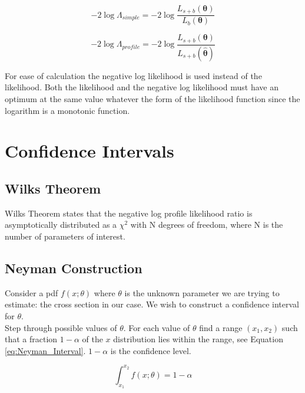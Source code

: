 \begin{equation}
-2\log\Lambda_{simple} = -2\log\frac{L_{s+b}(\boldsymbol\theta)}{L_{b}(\boldsymbol\theta)}
\label{eq:Simple_Likelihood_Ratio}
\end{equation}

\begin{equation}
-2\log\Lambda_{profile} = -2\log\frac{L_{s+b}(\boldsymbol\theta)}{L_{s+b}(\hat{\boldsymbol\theta})}
\label{eq:Profile_Likelihood_Ratio}
\end{equation}

For ease of calculation the negative log likelihood is used instead of the likelihood.
Both the likelihood and the negative log likelihood  must have an optimum at the same 
value whatever the form of the likelihood function since the logarithm is a monotonic 
function.

\section{Confidence Intervals}

\subsection{Wilks Theorem}

Wilks Theorem states that the negative log profile likelihood ratio is 
asymptotically distributed as a $\chi^{2}$ with N degrees of freedom, where N is
the number of parameters of interest. 

\subsection{Neyman Construction}

Consider a pdf $f\left(x;\theta\right)$ where $\theta$ is the unknown parameter 
we are trying to estimate: the cross section in our case. We wish to construct a
confidence interval for $\theta$. \\

Step through possible values of $\theta$. For each value of $\theta$ find a range 
$\left(x_{1},x_{2}\right)$ such that a fraction $1 - \alpha$ of the $x$ 
distribution lies within the range, see Equation \ref{eq:Neyman_Interval}. 
$1 - \alpha$ is the confidence level.

\begin{equation}
\int_{x_{1}}^{x_{2}} f\left(x;\theta\right) = 1 - \alpha
\label{eq:Neyman_Interval}
\end{equation} 

